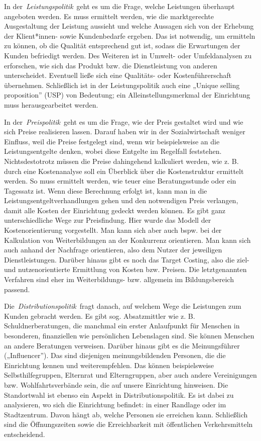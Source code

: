 \documentclass[
  letterpaper,
]{book}
\begin{document}
In der~\emph{Leistungspolitik}~geht es um die Frage, welche Leistungen
überhaupt angeboten werden. Es muss ermittelt werden, wie die
marktgerechte Ausgestaltung der Leistung aussieht und welche Aussagen
sich von der Erhebung der Klient*innen- sowie Kundenbedarfe ergeben. Das
ist notwendig, um ermitteln zu können, ob die Qualität entsprechend gut
ist, sodass die Erwartungen der Kunden befriedigt werden. Des Weiteren
ist in Umwelt- oder Umfeldanalysen zu erforschen, wie sich das Produkt
bzw. die Dienstleistung von anderen unterscheidet. Eventuell ließe sich
eine Qualitäts- oder Kostenführerschaft übernehmen. Schließlich ist in
der Leistungspolitik auch eine „Unique selling proposition'' (USP) von
Bedeutung; ein Alleinstellungsmerkmal der Einrichtung muss
herausgearbeitet werden.

In der~\emph{Preispolitik}~geht es um die Frage, wie der Preis gestaltet
wird und wie sich Preise realisieren lassen. Darauf haben wir in der
Sozialwirtschaft weniger Einfluss, weil die Preise festgelegt sind, wenn
wir beispielsweise an die Leistungsentgelte denken, wobei diese Entgelte
im Regelfall feststehen. Nichtsdestotrotz müssen die Preise dahingehend
kalkuliert werden, wie z. B. durch eine Kostenanalyse soll ein Überblick
über die Kostenstruktur ermittelt werden. So muss ermittelt werden, wie
teuer eine Beratungsstunde oder ein Tagessatz ist. Wenn diese Berechnung
erfolgt ist, kann man in die Leistungsentgeltverhandlungen gehen und den
notwendigen Preis verlangen, damit alle Kosten der Einrichtung gedeckt
werden können. Es gibt ganz unterschiedliche Wege zur Preisfindung. Hier
wurde das Modell der Kostenorientierung vorgestellt. Man kann sich aber
auch bspw. bei der Kalkulation von Weiterbildungen an der Konkurrenz
orientieren. Man kann sich auch anhand der Nachfrage orientieren, also
dem Nutzer der jeweiligen Dienstleistungen. Darüber hinaus gibt es noch
das Target Costing, also die ziel- und nutzenorientierte Ermittlung von
Kosten bzw. Preisen. Die letztgenannten Verfahren sind eher im
Weiterbildungs- bzw. allgemein im Bildungsbereich passend.

Die~\emph{Distributionspolitik}~fragt danach, auf welchem Wege die
Leistungen zum Kunden gebracht werden. Es gibt sog. Absatzmittler wie z.
B. Schuldnerberatungen, die manchmal ein erster Anlaufpunkt für Menschen
in besonderen, finanziellen wie persönlichen Lebenslagen sind. Sie
können Menschen an andere Beratungen verweisen. Darüber hinaus gibt es
die Meinungsführer („Influencer''). Das sind diejenigen
meinungsbildenden Personen, die die Einrichtung kennen und
weiterempfehlen. Das können beispielsweise Selbsthilfegruppen, Elternrat
und Elterngruppen, aber auch andere Vereinigungen bzw.
Wohlfahrtsverbände sein, die auf unsere Einrichtung hinweisen. Die
Standortwahl ist ebenso ein Aspekt in Distributionspolitik. Es ist dabei
zu analysieren, wo sich die Einrichtung befindet: in einer Randlage oder
im Stadtzentrum. Davon hängt ab, welche Personen sie erreichen kann.
Schließlich sind die Öffnungszeiten sowie die Erreichbarkeit mit
öffentlichen Verkehrsmitteln entscheidend.
\end{document}
